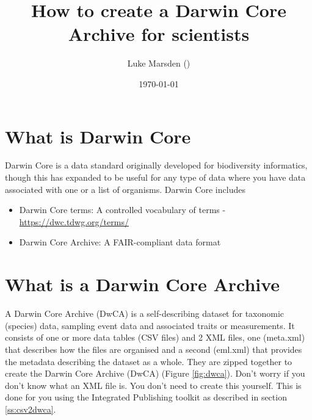 \documentclass[a4paper,english, 11pt]{article}
\title{How to create a Darwin Core Archive for scientists}
\date{\today}
\author{Luke Marsden (\emailme)}
\begin{document}
\maketitle
\tableofcontents
\newpage

\section{What is Darwin Core}
\label{s:dwc}

Darwin Core is a data standard originally developed for biodiversity informatics, though this has expanded to be useful for any type of data where you have data associated with one or a list of organisms. Darwin Core includes
\begin{itemize}
\item Darwin Core terms: A controlled vocabulary of terms - \url{https://dwc.tdwg.org/terms/}
\item Darwin Core Archive: A FAIR-compliant data format
\end{itemize} 

\section{What is a Darwin Core Archive}
\label{s:dwca}

A Darwin Core Archive (DwCA) is a self-describing dataset for taxonomic (species) data, sampling event data and associated traits or measurements. It consists of one or more data tables (CSV files) and 2 XML files, one (meta.xml) that describes how the files are organised and a second  (eml.xml) that provides the metadata describing the dataset as a whole. They are zipped together to create the Darwin Core Archive (DwCA) (Figure \ref{fig:dwca}). Don't worry if you don't know what an XML file is. You don't need to create this yourself. This is done for you using the Integrated Publishing toolkit as described in section \ref{ss:csv2dwca}.
\end{document}
